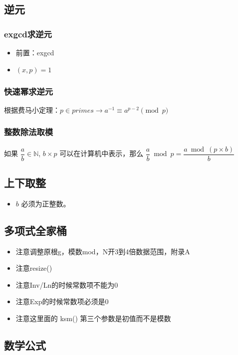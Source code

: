 \subsection{逆元}

\subsubsection{exgcd求逆元}
\begin{itemize}
    \item 前置：exgcd
    \item $(x,p)=1$
\end{itemize}


\subsubsection{快速幂求逆元}

根据费马小定理：$p\in primes\to a^{-1}\equiv a^{p - 2}\pmod{p}$

\subsubsection{整数除法取模}
如果 $\dfrac{a}{b}\in \mathbb{N}$, $b\times p$ 可以在计算机中表示，那么 $\dfrac{a}{b}\bmod p=\dfrac{a\bmod(p\times b)}{b}$
\subsection{上下取整}
\begin{itemize}
    \item $b$ 必须为正整数。
\end{itemize}



\subsection{多项式全家桶}
\begin{itemize}
    \item 注意调整原根g，模数mod，N开3到4倍数据范围，附录A
    \item 注意resize()
    \item 注意Inv/Ln的时候常数项不能为0
    \item 注意Exp的时候常数项必须是0
    \item 注意这里面的 ksm() 第三个参数是初值而不是模数
\end{itemize}


\subsection{数学公式}
\subsubsection{}